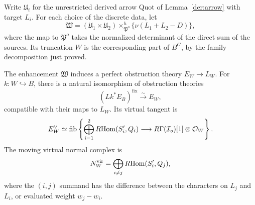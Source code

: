 Write $\mathfrak U_i$ for the unrestricted derived arrow Quot of
Lemma~\ref{der:arrow} with target $L_i$.  For each choice of the discrete
data, let
\[
\mathfrak W=(\mathfrak U_1\times\mathfrak U_2)
\mathbin{\times^h_{\mathfrak P^o}}
\{\nu(L_1+L_2-D)\},
\]
where the map to $\mathfrak P^o$ takes the normalized determinant of
the direct sum of the sources.  Its truncation $W$ is the corresponding
part of $B^G$, by the family decomposition just proved.

\begin{proposition}\label{prop:fixed-pot}
The enhancement $\mathfrak W$ induces a perfect obstruction theory
$E_W\to L_W$.  For $k:W\hookrightarrow B$, there is a natural
isomorphism of obstruction theories
\begin{equation}\label{der:fixed-comparison}
(Lk^*E_B)^{\mathrm{fix}}\xrightarrow{\sim}E_W,
\end{equation}
compatible with their maps to $L_W$.  Its virtual tangent is
\begin{equation}\label{der:fixed-tangent}
E_W^\vee\simeq
\operatorname{fib}\left\{
\bigoplus_{i=1}^2R\!\operatorname{Hom}(S'_i,Q_i)
\longrightarrow R\Gamma(\mathcal I_o)[1]\otimes\mathcal O_W
\right\}.
\end{equation}
The moving virtual normal complex is
\begin{equation}\label{der:moving-normal}
N_W^{\mathrm{vir}}=\bigoplus_{i\ne j}R\!\operatorname{Hom}(S'_i,Q_j),
\end{equation}
where the $(i,j)$ summand has the difference between the characters on
$L_j$ and $L_i$, or evaluated weight $w_j-w_i$.
\end{proposition}

